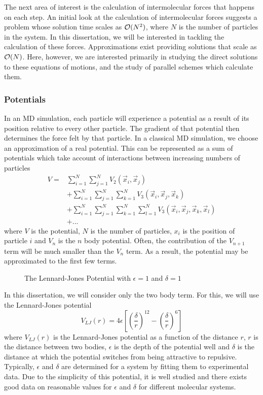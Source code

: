 The next area of interest is
the calculation of intermolecular forces that happens on each step.
%
An initial look at the calculation of intermolecular forces suggests
a problem whose solution time scales as $\mathcal{O}{(N^2)}$,
where $N$ is the number of particles in the system.
%
In this dissertation, we will be interested in
tackling the calculation of these forces.
%
Approximations exist providing solutions that scale as $\mathcal{O}{(N)}$.
%
Here, however, we are interested primarily in
studying the direct solutions to these equations of motions,
and the study of parallel schemes which calculate them.


\subsubsection{Potentials}

In an MD simulation, each particle will experience
a potential as a result of its position relative to every other particle.
%
The gradient of that potential then determines
the force felt by that particle.
%
In a classical MD simulation, we choose an approximation of a real potential.
This can be represented as a sum of potentials
which take account of interactions between increasing numbers of particles
\begin{align}
    V =&   \sum_{i=1}^N \sum_{j=1}^N V_2(\vec{x}_i, \vec{x}_j)
    \\ & + \sum_{i=1}^N \sum_{j=1}^N \sum_{k=1}^N
            V_3(\vec{x}_i, \vec{x}_j, \vec{x}_k)
    \\ & + \sum_{i=1}^N \sum_{j=1}^N \sum_{k=1}^N \sum_{l=1}^N
            V_3(\vec{x}_i, \vec{x}_j, \vec{x}_k, \vec{x}_l)
    \\ & + ...
\end  {align}
where $V$ is the potential,
$N$ is the number of particles,
$x_i$ is the position of particle $i$ and
$V_n$ is the $n$ body potential.
%
Often, the contribution of the $V_{n+1}$ term will be
much smaller than the $V_{n}$ term.
%
As a result, the potential may be approximated to the first few terms.


\begin{figure}
    
    \caption{The Lennard-Jones Potential with $\epsilon = 1$ and $\delta = 1$}
\end  {figure}
%
In this dissertation, we will consider only the two body term.
For this, we will use the Lennard-Jones potential
\begin{equation}
    V_{LJ}(r) = 4\epsilon \left[
        \left( \frac{\delta}{r} \right)^{12}
        - \left( \frac{\delta}{r} \right)^{6}
    \right]
\end  {equation}
where $V_{LJ}(r)$ is the Lennard-Jones potential as
a function of the distance $r$,
$r$ is the distance between two bodies,
$\epsilon$ is the depth of the potential well and
$\delta$ is the distance at which
the potential switches from being attractive to repulsive.
Typically, $\epsilon$ and $\delta$ are determined for a system by
fitting them to experimental data.
%
Due to the simplicity of this potential,
it is well studied and there exists good data on
reasonable values for $\epsilon$ and $\delta$ for
different molecular systems.

